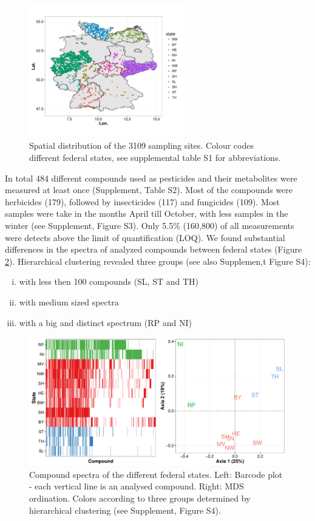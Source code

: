 \documentclass[journal=esthag,manuscript=article]{achemso}
\begin{document}
\begin{figure}[ht]
  \includegraphics[width=0.6\textwidth]{figure1.pdf}
  \caption{Spatial distribution of the 3109 sampling sites. Colour codes different federal states, see supplemental table S1 for abbreviations.}
  \label{fig:fig1}
\end{figure}

In total 484 different compounds used as pesticides and their metabolites were measured at least once (Supplement, Table S2). 
Most of the compounds were herbicides (179), followed by insecticides (117) and fungicides (109).
Most samples were take in the months April till October, with less samples in the winter (see Supplement, Figure S3).
Only 5.5\% (160,800) of all measurements were detects above the limit of quantification (LOQ).
We found substantial differences in the spectra of analyzed compounds between federal states (Figure \ref{fig:fig2}).
Hierarchical clustering revealed three groups (see also Supplemen,t Figure S4):

\begin{enumerate}[i)]
	\item with less then 100 compounds (SL, ST and TH)
	\item with medium sized spectra
	\item with a big and distinct spectrum (RP and NI)
\end{enumerate}

\begin{figure}[ht]
  \includegraphics[width=\textwidth]{figure2.pdf}
  \caption{Compound spectra of the different federal states. Left: Barcode plot - each vertical line is an analysed compound. Right: MDS ordination. 
  Colors according to three groups determined by hierarchical clustering (see Supplement, Figure S4).}
  \label{fig:fig2}
\end{figure}
\end{document}
